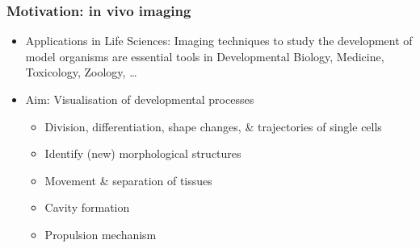 \documentclass{beamer}
\begin{document}
\begin{frame}
  \frametitle{Motivation: in vivo imaging}
  \begin{itemize}
  \item Applications in Life Sciences: Imaging techniques to study the
    development of model organisms are essential tools in
    Developmental Biology, Medicine, Toxicology, Zoology, …
  \item Aim: Visualisation of developmental processes
    \begin{itemize}
    \item Division, differentiation, shape changes, \& trajectories of
      single cells
    \item Identify (new) morphological structures
    \item Movement \& separation of tissues
    \item Cavity formation
    \item Propulsion mechanism
    \end{itemize}


\end{itemize}
\end{frame}
\end{document}
